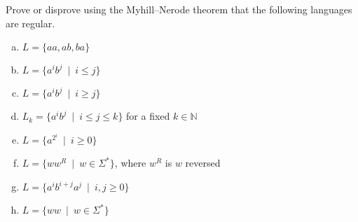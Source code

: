 \documentclass[a4paper,12pt]{amsart}
\begin{document}
\medskip\begin{problem}

    Prove or disprove using the Myhill--Nerode theorem that the following languages are regular.
    \begin{enumerate}[(a)]\setlength\itemsep{12pt}
        \item $L=\{aa, ab, ba\}$
        \item $L=\{a^ib^j\ \mid\ i\leq j\}$
        \item $L=\{a^ib^j\ \mid\ i\geq j\}$
        \item $L_k=\{a^ib^j\ \mid\ i\leq j\leq k\}$ for a fixed $k\in\mathbb N$
        \item $L=\{a^{2^i}\ \mid\ i\geq 0\}$
        \item $L=\{ww^R\ \mid \ w\in\Sigma^*\}$, where $w^R$ is $w$ reversed
        \item $L=\{a^ib^{i+j}a^j\ \mid\ i,j\geq 0\}$
        \item $L=\{ww\ \mid \ w\in\Sigma^*\}$
    \end{enumerate}

\end{problem}
\end{document}
